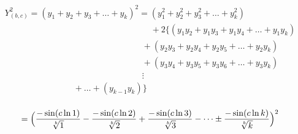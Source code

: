 \documentclass{amsart}
\begin{document}
	\[ \begin{array}{c}
		Y_{(b,c)}^2 = (y_1 + y_2 + y_3 + \dots + y_k)^2 = (y_1^2 + y_2^2 + y_3^2 + \dots + y_k^2) \\
		\qquad\qquad\qquad\qquad\qquad\qquad\qquad\qquad\quad + 2\{(y_1y_2 + y_1y_3 + y_1y_4 + \dots + y_{1}y_{k}) \\ 
		\qquad\qquad\qquad\qquad\qquad\qquad\qquad\qquad + (y_2y_3 + y_2y_4 + y_2y_5 + \dots + y_2y_{k}) \\ 
		\qquad\qquad\qquad\qquad\qquad\qquad\qquad\qquad + (y_3y_4 + y_3y_5 + y_3y_6 + \dots + y_3y_{k}) \\ 
		\qquad\qquad\qquad\qquad\qquad\qquad\qquad\qquad \vdots \\
		\qquad\qquad\qquad\qquad + \dots + (y_{k-1}y_{k}) \} \\ 
	\end{array} \]
	\[\]
	
		\[ = \Bigl( \frac{-\sin({c\ln 1})}{\sqrt[b]{1}} - \frac{-\sin({c\ln 2})}{\sqrt[b]{2}} + \frac{-\sin({c\ln 3})}{\sqrt[b]{3}} - \dots \pm \frac{-\sin({c\ln k})}{\sqrt[b]{k}} \Bigr)^2 \]
	
\end{document}

